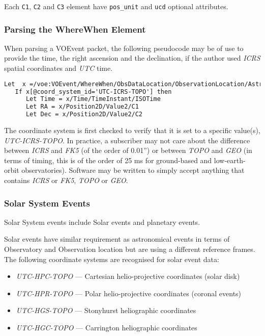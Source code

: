 \documentclass[11pt,a4paper]{ivoa}
\begin{document}
Each {\tt C1}, {\tt C2} and {\tt C3} element have {\tt pos\_unit} and {\tt ucd}
optional attributes.

\subsubsection{Parsing the WhereWhen Element}
\label{sec:3.4.3}
When parsing a VOEvent packet, the following pseudocode may be of use to provide
the time, the right ascension and the declination, if the author used
\emph{ICRS} spatial coordinates and \emph{UTC} time.
\begin{lstlisting}[language=XML]
Let  x =/voe:VOEvent/WhereWhen/ObsDataLocation/ObservationLocation/AstroCoords
   If x[@coord_system_id='UTC-ICRS-TOPO'] then
      Let Time = x/Time/TimeInstant/ISOTime
      Let RA = x/Position2D/Value2/C1
      Let Dec = x/Position2D/Value2/C2
\end{lstlisting}

The coordinate system is first checked to verify that it is set to a specific
value(s), \emph{UTC-ICRS-TOPO}. In practice, a subscriber may not care about the
difference between \emph{ICRS} and \emph{FK5} (of the order of 0.01'') or
between \emph{TOPO} and \emph{GEO} (in terms of timing, this is of the order of
25 ms for ground-based and low-earth-orbit observatories). Software may be
written to simply accept anything that contains \emph{ICRS} or \emph{FK5},
\emph{TOPO} or \emph{GEO}.


\subsubsection{Solar System Events}
\label{sec:3.4.4}
Solar System events include Solar events and planetary events.

Solar events have similar requirement as astronomical events in terms of
Observatory and Observation location but are using a different reference frames.
The following coordinate systems are recognised for solar event data:
\begin{itemize}
\item \emph{UTC-HPC-TOPO} --- Cartesian helio-projective coordinates (solar
disk)
\item \emph{UTC-HPR-TOPO} --- Polar helio-projective coordinates (coronal
events)
\item \emph{UTC-HGS-TOPO} --- Stonyhurst heliographic coordinates
\item \emph{UTC-HGC-TOPO} --- Carrington heliographic coordinates
\end{itemize}
\end{document}
